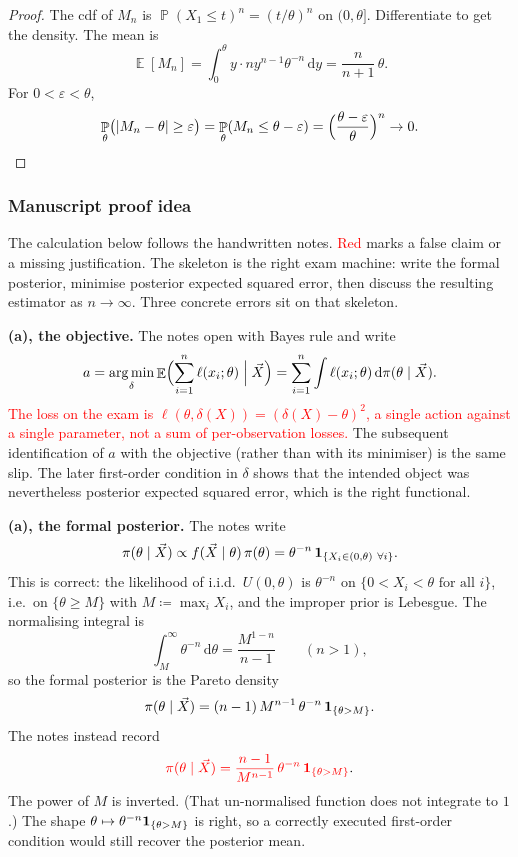 \documentclass[11pt,a4paper]{article}
\newcommand{\mserr}[1]{\textcolor{red}{#1}}
\DeclareMathOperator*{\argmin}{arg\,min}
\DeclareMathOperator{\E}{\mathbb{E}}
\DeclareMathOperator{\Pbb}{\mathbb{P}}
\begin{document}
\begin{proof}
The cdf of \( M_n \) is \( \Pbb(X_1\le t)^{n}=(t/\theta)^{n} \) on \( (0,\theta] \). Differentiate to get the density. The mean is
\[
\E[M_n]
=
\int_{0}^{\theta} y\cdot n y^{n-1}\theta^{-n}\,\mathrm{d}y
=
\frac{n}{n+1}\,\theta.
\]
For \( 0<\varepsilon<\theta \),
\[
\Pbb_\theta\bigl(|M_n-\theta|\ge\varepsilon\bigr)
=
\Pbb_\theta(M_n\le\theta-\varepsilon)
=
\Bigl(\frac{\theta-\varepsilon}{\theta}\Bigr)^{n}
\to 0.
\]
\end{proof}

\subsubsection{Manuscript proof idea}

The calculation below follows the handwritten notes. \mserr{Red} marks a false claim or a missing justification. The skeleton is the right exam machine: write the formal posterior, minimise posterior expected squared error, then discuss the resulting estimator as \( n\to\infty \). Three concrete errors sit on that skeleton.

\textbf{(a), the objective.}
The notes open with Bayes rule and write
\[
a
=
\argmin_{\delta}
\E\Bigl(\sum_{i=1}^{n}\ell(x_i;\theta)\Bigm|\vec{X}\Bigr)
=
\sum_{i=1}^{n}\int \ell(x_i;\theta)\,\mathrm{d}\pi(\theta\mid\vec{X}).
\]
\mserr{The loss on the exam is \( \ell(\theta,\delta(X))=(\delta(X)-\theta)^{2} \), a single action against a single parameter, not a sum of per-observation losses.} The subsequent identification of \( a \) with the objective (rather than with its minimiser) is the same slip. The later first-order condition in \( \delta \) shows that the intended object was nevertheless posterior expected squared error, which is the right functional.

\textbf{(a), the formal posterior.}
The notes write
\[
\pi(\theta\mid\vec{X})
\propto
f(\vec{X}\mid\theta)\,\pi(\theta)
=
\theta^{-n}\,\mathbf{1}_{\{X_i\in(0,\theta)\ \forall i\}}.
\]
This is correct: the likelihood of i.i.d.\ \( U(0,\theta) \) is \( \theta^{-n} \) on \( \{0<X_i<\theta\text{ for all }i\} \), i.e.\ on \( \{\theta\ge M\} \) with \( M\coloneqq\max_i X_i \), and the improper prior is Lebesgue. The normalising integral is
\[
\int_{M}^{\infty}\theta^{-n}\,\mathrm{d}\theta
=
\frac{M^{1-n}}{n-1}
\qquad(n>1),
\]
so the formal posterior is the Pareto density
\[
\pi(\theta\mid\vec{X})
=
(n-1)\,M^{n-1}\,\theta^{-n}\,\mathbf{1}_{\{\theta>M\}}.
\]
The notes instead record
\[
\mserr{\pi(\theta\mid\vec{X})=\frac{n-1}{M^{n-1}}\,\theta^{-n}\,\ind_{\{\theta>M\}}}.
\]
The power of \( M \) is inverted. (That un-normalised function does not integrate to \( 1 \).) The shape \( \theta\mapsto\theta^{-n}\mathbf{1}_{\{\theta>M\}} \) is right, so a correctly executed first-order condition would still recover the posterior mean.
\end{document}
